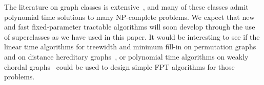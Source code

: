 \documentclass{llncs}
\begin{document}
The literature on graph classes is extensive~\cite{BLS}, and many of these classes admit polynomial time solutions to many NP-complete problems. We expect that new and fast fixed-parameter tractable algorithms will soon develop through the use of superclasses as we have used in this paper. It would be interesting to see if the linear time algorithms for treewidth and minimum fill-in on permutation graphs~\cite{Mei} and on distance hereditary graphs~\cite{BDK}, or polynomial time algorithms on weakly chordal graphs~\cite{BT99} could be used to design simple FPT algorithms for those problems.





\end{document}

